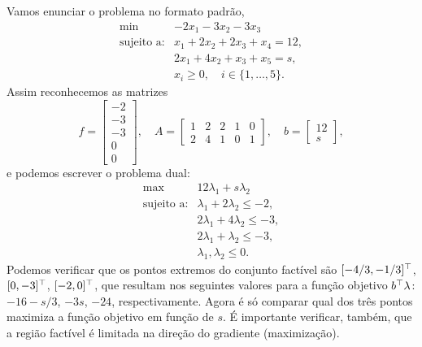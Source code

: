 \begin{questions}
\setcounter{question}{25}
\begin{solution}
    Vamos enunciar o problema no formato padrão,
    $$\begin{array}{rl}
    \min & -2x_1 - 3x_2 - 3x_3 \\
    \textrm{sujeito a:}
    & x_1 + 2x_2 + 2x_3 + x_4 = 12,\\
    & 2x_1 + 4x_2 + x_3 + x_5 = s,\\
    & x_i \geq 0,\quad i\in\{1,\dots,5\}.
    \end{array}$$
    Assim reconhecemos as matrizes
    \[    
    f = \begin{bmatrix} -2\\ -3\\ -3\\ 0\\ 0 \end{bmatrix},\quad
    A = \begin{bmatrix} 1 & 2 & 2 & 1 & 0\\ 2 & 4 & 1 & 0 & 1 \end{bmatrix},\quad
    b = \begin{bmatrix} 12\\ s \end{bmatrix},
    \]
    e podemos escrever o problema dual:
    $$\begin{array}{rl}
    \max & 12\lambda_1 + s\lambda_2 \\
    \textrm{sujeito a:}
    & \lambda_1 + 2\lambda_2 \le -2,\\
    & 2\lambda_1 + 4\lambda_2 \le -3,\\
    & 2\lambda_1 + \lambda_2 \le -3,\\
    & \lambda_1,\lambda_2 \le 0.
    \end{array}$$
    Podemos verificar que os pontos extremos do conjunto factível são $[-4/3,-1/3]^\top$, $[0,-3]^\top$, $[-2,0]^\top$, que resultam nos seguintes valores para a função objetivo $b^\top\lambda$: $-16-s/3$, $-3s$, $-24$, respectivamente. Agora é só comparar qual dos três pontos maximiza a função objetivo em função de $s$. É importante verificar, também, que a região factível é limitada na direção do gradiente (maximização).
    

\end{solution}
\end{questions}
